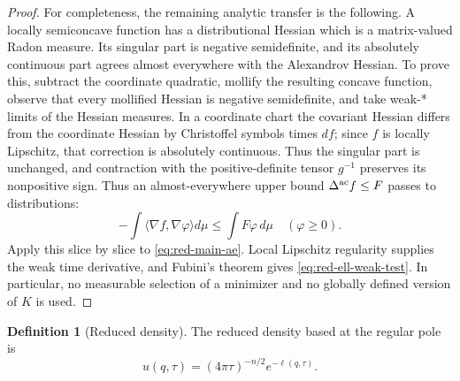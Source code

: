 \documentclass[10pt]{coll-l}
\theoremstyle{definition}
\newtheorem{definition}[theorem]{Definition}
\theoremstyle{remark}
\numberwithin{section}{chapter}
\numberwithin{equation}{chapter}
\begin{document}
\begin{proof}
For completeness, the remaining analytic transfer is the following.  A
locally semiconcave function has a distributional Hessian which is a
matrix-valued Radon measure.  Its singular part is negative semidefinite,
and its absolutely continuous part agrees almost everywhere with the
Alexandrov Hessian.  To prove this, subtract the coordinate quadratic,
mollify the resulting concave function, observe that every mollified Hessian
is negative semidefinite, and take weak-* limits of the Hessian measures.
In a coordinate chart the covariant Hessian differs from the coordinate
Hessian by Christoffel symbols times $df$; since $f$ is locally Lipschitz,
that correction is absolutely continuous.  Thus the singular part is
unchanged, and contraction with the positive-definite tensor $g^{-1}$
preserves its nonpositive sign.
Thus an almost-everywhere upper bound $\Delta^{\rm ac} f\leq F$ passes to
distributions:
\begin{equation}
       -\int\langle\nabla f,\nabla\varphi\rangle d\mu
       \leq\int F\varphi\,d\mu
       \quad(\varphi\geq0).                             \label{eq:red-semiconcavity-transfer}
\end{equation}
Apply this slice by slice to \eqref{eq:red-main-ae}.  Local Lipschitz
regularity supplies the weak time derivative, and Fubini's theorem gives
\eqref{eq:red-ell-weak-test}.  In particular, no measurable selection of a
minimizer and no globally defined version of $K$ is used.
\end{proof}

\begin{definition}[Reduced density]
\label{def:red-density}
The reduced density based at the regular pole is
\begin{equation}
                     u(q,\tau)
       =(4\pi\tau)^{-n/2}e^{-\ell(q,\tau)}.              \label{eq:red-density}
\end{equation}
\end{definition}
\end{document}
